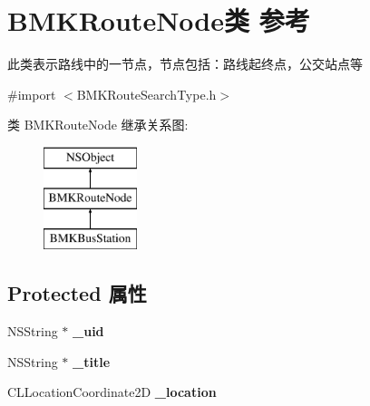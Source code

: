 \hypertarget{interface_b_m_k_route_node}{\section{B\+M\+K\+Route\+Node类 参考}
\label{interface_b_m_k_route_node}
}


此类表示路线中的一节点，节点包括：路线起终点，公交站点等  




{\ttfamily \#import $<$B\+M\+K\+Route\+Search\+Type.\+h$>$}

类 B\+M\+K\+Route\+Node 继承关系图\+:\begin{figure}[H]
\begin{center}
\leavevmode
\includegraphics[height=3.000000cm]{interface_b_m_k_route_node}
\end{center}
\end{figure}
\subsection*{Protected 属性}
\begin{DoxyCompactItemize}
\item 
\hypertarget{interface_b_m_k_route_node_aea076ef4640413168162572460252743}{N\+S\+String $\ast$ {\bfseries \+\_\+uid}}\label{interface_b_m_k_route_node_aea076ef4640413168162572460252743}

\item 
\hypertarget{interface_b_m_k_route_node_a5fdb2b4ec6cda2a9b97796c6d2583ce5}{N\+S\+String $\ast$ {\bfseries \+\_\+title}}\label{interface_b_m_k_route_node_a5fdb2b4ec6cda2a9b97796c6d2583ce5}

\item 
\hypertarget{interface_b_m_k_route_node_af10ce80ceda0f352764ed59e98ba3deb}{C\+L\+Location\+Coordinate2\+D {\bfseries \+\_\+location}}\label{interface_b_m_k_route_node_af10ce80ceda0f352764ed59e98ba3deb}

\end{DoxyCompactItemize}

